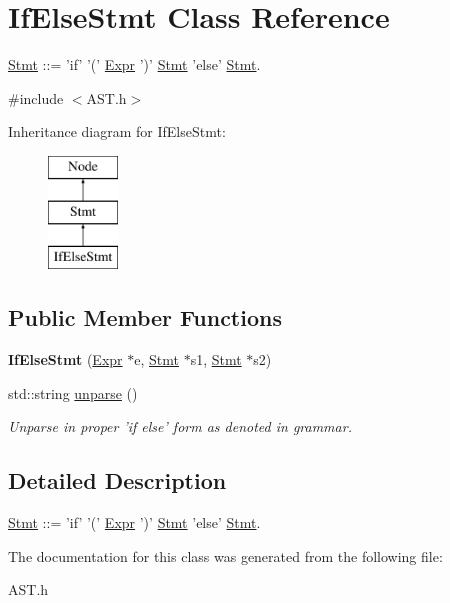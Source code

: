 \hypertarget{classIfElseStmt}{\section{If\-Else\-Stmt Class Reference}
\label{classIfElseStmt}
}


\hyperlink{classStmt}{Stmt} \-:\-:= 'if' '(' \hyperlink{classExpr}{Expr} ')' \hyperlink{classStmt}{Stmt} 'else' \hyperlink{classStmt}{Stmt}.  




{\ttfamily \#include $<$A\-S\-T.\-h$>$}

Inheritance diagram for If\-Else\-Stmt\-:\begin{figure}[H]
\begin{center}
\leavevmode
\includegraphics[height=3.000000cm]{classIfElseStmt}
\end{center}
\end{figure}
\subsection*{Public Member Functions}
\begin{DoxyCompactItemize}
\item 
\hypertarget{classIfElseStmt_a9e0fde33a0889aa64175dfdf7e7326da}{{\bfseries If\-Else\-Stmt} (\hyperlink{classExpr}{Expr} $\ast$e, \hyperlink{classStmt}{Stmt} $\ast$s1, \hyperlink{classStmt}{Stmt} $\ast$s2)}\label{classIfElseStmt_a9e0fde33a0889aa64175dfdf7e7326da}

\item 
\hypertarget{classIfElseStmt_a82267559f8fdd5f10cf14e616f3867f2}{std\-::string \hyperlink{classIfElseStmt_a82267559f8fdd5f10cf14e616f3867f2}{unparse} ()}\label{classIfElseStmt_a82267559f8fdd5f10cf14e616f3867f2}

\begin{DoxyCompactList}\small\item\em Unparse in proper 'if else' form as denoted in grammar. \end{DoxyCompactList}\end{DoxyCompactItemize}


\subsection{Detailed Description}
\hyperlink{classStmt}{Stmt} \-:\-:= 'if' '(' \hyperlink{classExpr}{Expr} ')' \hyperlink{classStmt}{Stmt} 'else' \hyperlink{classStmt}{Stmt}. 

The documentation for this class was generated from the following file\-:\begin{DoxyCompactItemize}
\item 
A\-S\-T.\-h\end{DoxyCompactItemize}
